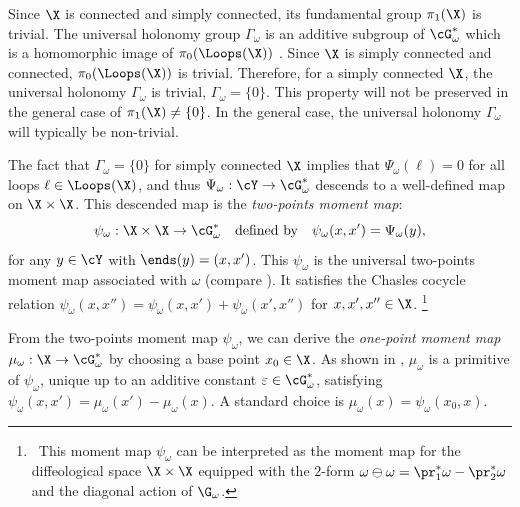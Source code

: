 \begin{article}
    Since $\X$ is connected and simply connected,
    its fundamental group $\pi_1(\X)$ is trivial.
    The universal holonomy group $\Gamma_\omega$ is an additive subgroup of $\cG_\omega^*$ which is a homomorphic image of $\pi_0(\Loops(\X))$ \cite[Art.~3.7]{PIZ10}.
    Since $\X$ is simply connected and connected,
    $\pi_0(\Loops(\X))$ is trivial.
    Therefore,
    for a simply connected $\X$,
    the universal holonomy $\Gamma_\omega$ is trivial,
    $\Gamma_\omega = \{0\}$.
    This property will not be preserved in the general case of $\pi_1(\X) \neq \{0\}$.
    In the general case,
    the universal holonomy $\Gamma_\omega$ will typically be non-trivial.
    
    The fact that $\Gamma_\omega=\{0\}$ for simply connected $\X$ implies that $\Psi_\omega(\ell)=0$ for all loops $\ell \in \Loops(\X)$,
    and thus $\Psi_\omega : \cY \to \cG_\omega^*$ descends to a well-defined map on $\X \times \X$.
    This descended map is the \emph{two-points moment map}:
    $$
      \psi_\omega : \X \times \X \to \cG_\omega^*
      \quad \text{defined by} \quad
      \psi_\omega(x,x') = \Psi_\omega(y),
      $$
    for any $y \in \cY$ with $\ends(y) = (x,x')$.
    This $\psi_\omega$ is the universal two-points moment map associated with $\omega$ (compare \cite[Art.~4.1]{PIZ10}).
    It satisfies the Chasles cocycle relation $\psi_\omega(x,x'') = \psi_\omega(x,x') + \psi_\omega(x',x'')$ for $x,x',x'' \in \X$.%
    \footnote{~This moment map $\psi_\omega$ can be interpreted as the moment map for the diffeological space $\X \times \X$ equipped with the $2$-form $\omega \ominus \omega = \pr_1^*\omega - \pr_2^*\omega$ and the diagonal action of $\G_\omega$.}
    
    From the two-points moment map $\psi_\omega$,
    we can derive the \emph{one-point moment map} $\mu_\omega : \X \to \cG_\omega^*$ by choosing a base point $x_0 \in \X$.
    As shown in \cite[Art.~5.1]{PIZ10},
    $\mu_\omega$ is a primitive of $\psi_\omega$,
    unique up to an additive constant $\varepsilon \in \cG_\omega^*$,
    satisfying $\psi_\omega(x,x') = \mu_\omega(x') - \mu_\omega(x)$.
    A standard choice is $\mu_\omega(x) = \psi_\omega(x_0,x)$.
    

\end{article}
